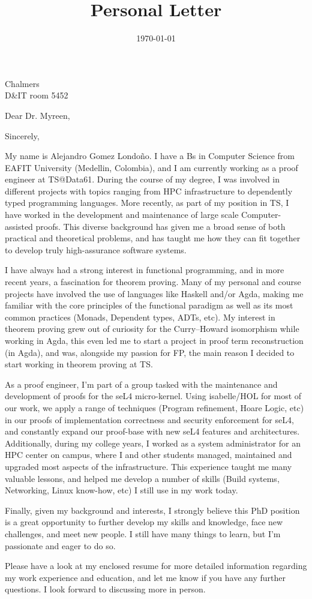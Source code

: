 \documentclass[11pt,a4paper,sans]{moderncv}        %
\title{Personal Letter}                               %
\begin{document}

          {Chalmers \\ D\&IT room 5452}
\date{\today}

\opening{Dear Dr. Myreen,}

\closing{Sincerely,}

\makelettertitle

My name is Alejandro Gomez Londoño. I have a Bs in Computer Science
from EAFIT University (Medellin, Colombia), and I am currently working
as a proof engineer at TS@Data61. During the course of my degree, I
was involved in different projects with topics ranging from HPC
infrastructure to dependently typed programming languages. More
recently, as part of my position in TS, I have worked in the
development and maintenance of large scale Computer-assisted proofs.
This diverse background has given me a broad sense of both practical
and theoretical problems, and has taught me how they can fit together
to develop truly high-assurance software systems.

I have always had a strong interest in functional programming, and in
more recent years, a fascination for theorem proving. Many of my
personal and course projects have involved the use of languages like
Haskell and/or Agda, making me familiar with the core principles of
the functional paradigm as well as its most common practices (Monads,
Dependent types, ADTs, etc). My interest in theorem proving grew out
of curiosity for the Curry–Howard isomorphism while working in Agda,
this even led me to start a project in proof term reconstruction (in
Agda), and was, alongside my passion for FP, the main reason I
decided to start working in theorem proving at TS.

As a proof engineer, I'm part of a group tasked with the maintenance
and development of proofs for the seL4 micro-kernel. Using
isabelle/HOL for most of our work, we apply a range of techniques
(Program refinement, Hoare Logic, etc) in our proofs of implementation
correctness and security enforcement for seL4, and constantly expand
our proof-base with new seL4 features and architectures. Additionally,
during my college years, I worked as a system administrator for an HPC
center on campus, where I and other students managed, maintained and
upgraded most aspects of the infrastructure. This experience taught me
many valuable lessons, and helped me develop a number of skills (Build
systems, Networking, Linux know-how, etc) I still use in my work today.

Finally, given my background and interests, I strongly believe this PhD
position is a great opportunity to further develop my skills and
knowledge, face new challenges, and meet new people. I still have many
things to learn, but I’m passionate and eager to do so.

Please have a look at my enclosed resume for more detailed information
regarding my work experience and education, and let me know if you have
any further questions. I look forward to discussing more in person.

\makeletterclosing
\end{document}
